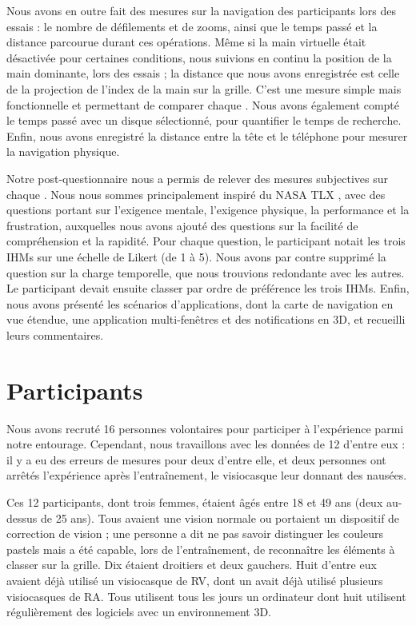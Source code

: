 Nous avons en outre fait des mesures sur la navigation des participants lors des essais : le nombre de défilements et de zooms, ainsi que le temps passé et la distance parcourue durant ces opérations. Même si la main virtuelle était désactivée pour certaines conditions, nous suivions en continu la position de la main dominante, lors des essais ; la distance que nous avons enregistrée est celle de la projection de l'index de la main sur la grille. C'est une mesure simple mais fonctionnelle et permettant de comparer chaque . Nous avons également compté le temps passé avec un disque sélectionné, pour quantifier le temps de recherche. Enfin, nous avons enregistré la distance entre la tête et le téléphone pour mesurer la navigation physique.

Notre post-questionnaire nous a permis de relever des mesures subjectives sur chaque . Nous nous sommes principalement inspiré du NASA TLX \cite{Rubio2004}, avec des questions portant sur l'exigence mentale, l'exigence physique, la performance et la frustration, auxquelles nous avons ajouté des questions sur la facilité de compréhension et la rapidité. Pour chaque question, le participant notait les trois IHMs sur une échelle de Likert (de 1 à 5). Nous avons par contre supprimé la question sur la charge temporelle, que nous trouvions redondante avec les autres. Le participant devait ensuite classer par ordre de préférence les trois IHMs. Enfin, nous avons présenté les scénarios d'applications, dont la carte de navigation en vue étendue, une application multi-fenêtres et des notifications en 3D, et recueilli leurs commentaires.


\section{Participants}
\label{sec:experiment_participants}

Nous avons recruté 16 personnes volontaires pour participer à l'expérience parmi notre entourage. Cependant, nous travaillons avec les données de 12 d'entre eux : il y a eu des erreurs de mesures pour deux d'entre elle, et deux personnes ont arrêtés l'expérience après l'entraînement, le visiocasque leur donnant des nausées.

Ces 12 participants, dont trois femmes, étaient âgés entre 18 et 49 ans (deux au-dessus de 25 ans). Tous avaient une vision normale ou portaient un dispositif de correction de vision ; une personne a dit ne pas savoir distinguer les couleurs pastels mais a été capable, lors de l'entraînement, de reconnaître les éléments à classer sur la grille. Dix étaient droitiers et deux gauchers. Huit d'entre eux avaient déjà utilisé un visiocasque de RV, dont un avait déjà utilisé plusieurs visiocasques de RA. Tous utilisent tous les jours un ordinateur dont huit utilisent régulièrement des logiciels avec un environnement 3D.


